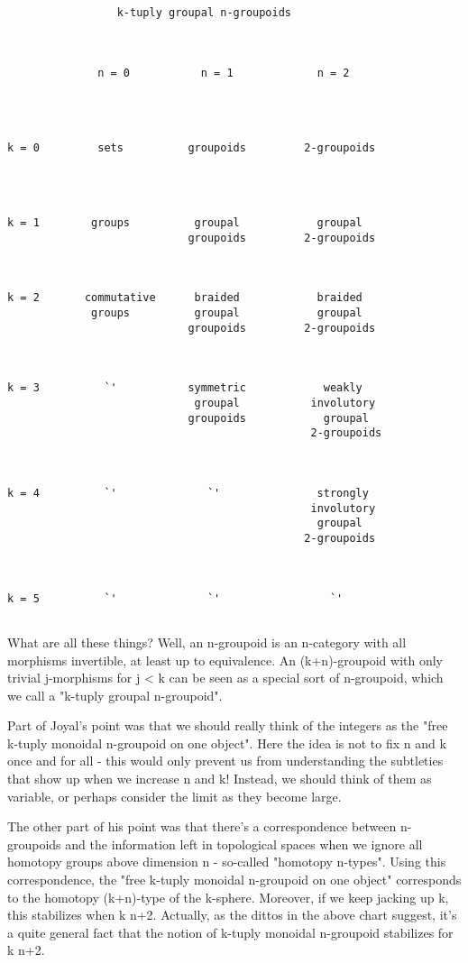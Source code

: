 \begin{verbatim}
                 k-tuply groupal n-groupoids



              n = 0           n = 1             n = 2




k = 0         sets          groupoids         2-groupoids
     



k = 1        groups          groupal            groupal
                            groupoids         2-groupoids



k = 2       commutative      braided            braided
             groups          groupal            groupal
                            groupoids         2-groupoids



k = 3          `'           symmetric            weakly
                             groupal           involutory
                            groupoids            groupal 
                                               2-groupoids



k = 4          `'              `'               strongly 
                                               involutory
                                                groupal
                                              2-groupoids



k = 5          `'              `'                 `'


\end{verbatim}
    
What are all these things?  Well, an n-groupoid is an n-category with
all morphisms invertible, at least up to equivalence.  An (k+n)-groupoid
with only trivial j-morphisms for j < k can be seen as a special sort of
n-groupoid, which we call a "k-tuply groupal n-groupoid".  

Part of Joyal's point was that we should really think of the integers as
the "free k-tuply monoidal n-groupoid on one object".  Here the idea is
not to fix n and k once and for all - this would only prevent us from
understanding the subtleties that show up when we increase n and k!
Instead, we should think of them as variable, or perhaps consider the
limit as they become large.  

The other part of his point was that there's a correspondence between
n-groupoids and the information left in topological spaces when we
ignore all homotopy groups above dimension n - so-called "homotopy
n-types".  Using this correspondence, the "free k-tuply monoidal
n-groupoid on one object" corresponds to the homotopy (k+n)-type of the
k-sphere.  Moreover, if we keep jacking up k, this stabilizes when k \ge 
n+2.  Actually, as the dittos in the above chart suggest, it's a quite
general fact that the notion of k-tuply monoidal n-groupoid stabilizes
for k \ge  n+2.

